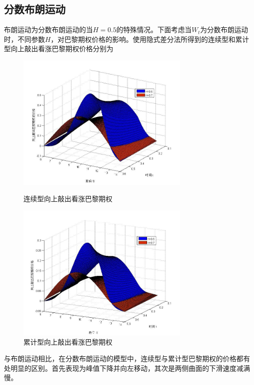 \documentclass{ctexart} %
\begin{document}
\subsection{分数布朗运动}
布朗运动为分数布朗运动的当$H=0.5$的特殊情况。下面考虑当$W_t$为分数布朗运动时，不同参数$H$，对巴黎期权价格的影响。使用隐式差分法所得到的连续型和累计型向上敲出看涨巴黎期权价格分别为
\begin{figure}[H]
\begin{minipage}{0.48\linewidth}
\includegraphics[width=8.5cm]{code/paris_fbm1.jpg}
\caption{连续型向上敲出看涨巴黎期权}
\end{minipage}
\begin{minipage}{0.48\linewidth}
\includegraphics[width=8.5cm]{code/parisc_fbm1.jpg}
\caption{累计型向上敲出看涨巴黎期权}
\end{minipage}
\end{figure}
与布朗运动相比，在分数布朗运动的模型中，连续型与累计型巴黎期权的价格都有处明显的区别。首先表现为峰值下降并向左移动，其次是两侧曲面的下滑速度减满慢。
\end{document}
